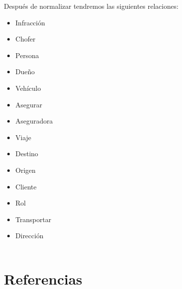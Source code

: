 \documentclass{article}
\begin{document}
Después de normalizar tendremos las siguientes relaciones:
\begin{itemize}
\item Infracción\\
\item Chofer\\
\item Persona\\
\item Dueño\\
\item Vehículo\\
\item Asegurar\\
\item Aseguradora\\
\item Viaje\\
\item Destino\\
\item Origen\\
\item Cliente\\
\item Rol\\
\item Transportar\\
\item Dirección\\
\\
\end{itemize}


\section{Referencias}
\end{document}
